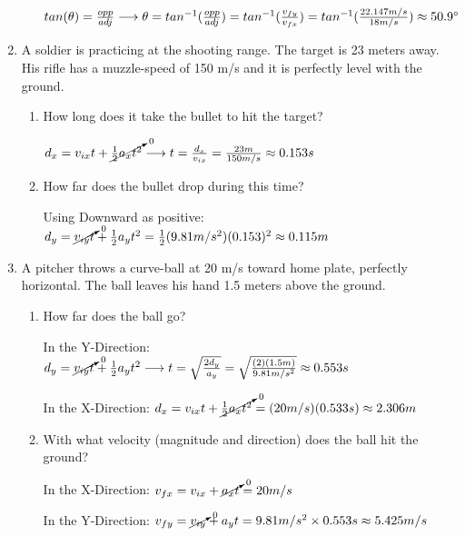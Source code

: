 \documentclass[letterpaper, 12pt]{article}
\begin{document}
\begin{enumerate}
\begin{enumerate}
	\color{red}
	$tan(\theta) = \frac{opp}{adj} \longrightarrow \theta = tan^{-1}(\frac{opp}{adj}) = tan^{-1}(\frac{v_{fy}}{v_{fx}}) =  tan^{-1}(\frac{22.147 m/s}{18 m/s}) \approx 50.9 \degree  $
	\color{black}
	\vspace{.1in}
	
\end{enumerate}

\item A soldier is practicing at the shooting range. The target is 23 meters away.  His rifle has a muzzle-speed of 150 m/s and it is perfectly level with the ground.
\begin{enumerate}
	\item How long does it take the bullet to hit the target?
	
		\color{red}
	$d_x = {v_{ix}t} + \cancelto{0}{\frac{1}{2}a_x t^2} \longrightarrow t = \frac{d_x}{v_{ix}} = \frac{23 m}{150 m/s} \approx 0.153 s  $
	
	\vspace{0.15in}
	\color{black}
	
	\item How far does the bullet drop during this time?
		\color{red}
		
		Using Downward as positive: $d_y = \cancelto{0}{v_{iy} t} + \frac{1}{2}a_y t^2 =  \frac{1}{2}(9.81 m/s^2) (0.153)^2 \approx 0.115 m$ 
			\color{black}
			\vspace{-0.1in}
\end{enumerate}
\item  A pitcher throws a curve-ball at 20 m/s toward home plate, perfectly horizontal.  The ball leaves his hand 1.5 meters above the ground.  
\begin{enumerate}
	\item How far does the ball go?
	\color{red}
	
	In the Y-Direction: $d_y = \cancelto{0}{v_{iy}t} + \frac{1}{2}a_y t^2 \longrightarrow t = \sqrt{\frac{2 d_y}{a_y}} = \sqrt{\frac{(2) (1.5m)}{9.81 m/s^2}} \approx 0.553 s $
	
	In the X-Direction: $d_x = v_{ix} t + \cancelto{0}{\frac{1}{2}a_x t^2}  = (20 m/s)(0.533s) \approx 2.306 m $

	\color{black}
	\item With what velocity (magnitude and direction) does the ball hit the ground?
		\color{red}
		
	In the X-Direction: $ v_{fx} = v_{ix} + \cancelto{0}{a_x t} = 20 m/s$  
	
	In the Y-Direction: $ v_{fy} = \cancelto{0}{v_{iy}} + a_y t = 9.81 m/s^2 \times 0.553s \approx 5.425 m/s$
	

\end{enumerate}
\end{enumerate}
\end{document}
